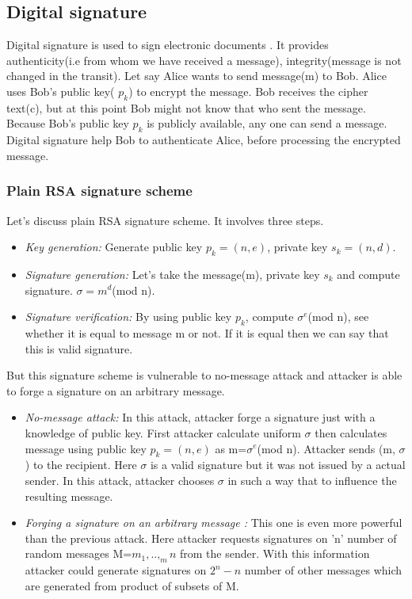 \documentclass{article}
\begin{document}
\subsection{Digital signature}
  
Digital signature is used to sign electronic documents . It provides authenticity(i.e from whom we have received a message), integrity(message is not changed in the transit).
Let say Alice wants to send message(m) to Bob. Alice uses Bob's public key( $p_{k}$) to encrypt the message. Bob receives the cipher text(c), but at this point Bob might not know that who sent the message. Because Bob's public key $p_{k}$ is publicly available, any one can send a message. Digital signature help Bob to authenticate Alice, before processing the encrypted message.

\subsubsection{Plain RSA signature scheme}
Let's discuss plain RSA signature scheme. It involves three steps.
\begin{itemize}
	\item \textit{Key generation: } Generate public key $p_{k}=(n,e)$, private key $s_{k}=(n,d)$.
	\item \textit{Signature generation: } Let's take the message(m), private key $s_{k}$ and compute signature.
	                                            $\sigma=m^{d}$(mod n).
	\item \textit{Signature verification: } By using public key $p_{k}$, compute $\sigma^{e}$(mod n), see whether it is equal to message m or not. If it is equal then we can say that this is valid signature.
	
\end{itemize} 
But this signature scheme is vulnerable to no-message attack and attacker is able to forge a signature on an arbitrary message.
\begin{itemize}
	\item \textit{No-message attack:} In this attack, attacker forge a signature just with a knowledge of public key. First attacker calculate uniform $\sigma$ then calculates message using public key $p_{k}=(n,e)$ as m=$\sigma^{e}$(mod n). Attacker sends (m, $\sigma$) to the recipient. Here $\sigma$ is a valid signature but it was not issued by a actual sender. In this attack, attacker chooses $\sigma$ in such a way that to influence the resulting message.
	\item \textit{Forging a signature on an arbitrary message : }This one is even more powerful than the previous attack. Here attacker requests signatures on 'n' number of random messages M={$m_{1}, .., _m{n}$} from the sender. With this information attacker could generate signatures on $2^{n}-n$ number of other messages which are generated from product of subsets of M.
	\end{itemize}
\end{document}
